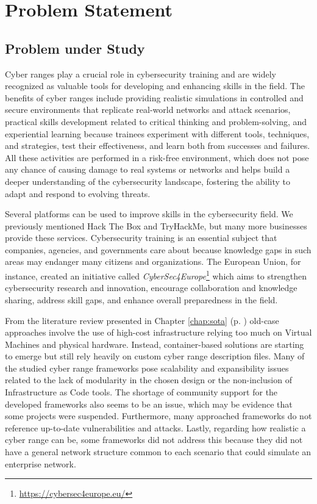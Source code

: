 \chapter{Problem Statement}\label{chap:problem_statement}

\minitoc

\section{Problem under Study} \label{sec:research_problem}

Cyber ranges play a crucial role in cybersecurity training and are widely recognized as valuable tools for developing and enhancing skills in the field. The benefits of cyber ranges include providing realistic simulations in controlled and secure environments that replicate real-world networks and attack scenarios, practical skills development related to critical thinking and problem-solving, and experiential learning because trainees experiment with different tools, techniques, and strategies, test their effectiveness, and learn both from successes and failures. All these activities are performed in a risk-free environment, which does not pose any chance of causing damage to real systems or networks and helps build a deeper understanding of the cybersecurity landscape, fostering the ability to adapt and respond to evolving threats. 

Several platforms can be used to improve skills in the cybersecurity field. We previously mentioned Hack The Box and TryHackMe, but many more businesses provide these services. Cybersecurity training is an essential subject that companies, agencies, and governments care about because knowledge gaps in such areas may endanger many citizens and organizations. The European Union, for instance, created an initiative called \textit{CyberSec4Europe}\footnote{\url{https://cybersec4europe.eu/}} which aims to strengthen cybersecurity research and innovation, encourage collaboration and knowledge sharing, address skill gaps, and enhance overall preparedness in the field. 

From the literature review presented in Chapter \ref{chap:sota} (p. \pageref{chap:sota}) old-case approaches involve the use of high-cost infrastructure relying too much on Virtual Machines and physical hardware. Instead, container-based solutions are starting to emerge but still rely heavily on custom cyber range description files. Many of the studied cyber range frameworks pose scalability and expansibility issues related to the lack of modularity in the chosen design or the non-inclusion of Infrastructure as Code tools. The shortage of community support for the developed frameworks also seems to be an issue, which may be evidence that some projects were suspended. Furthermore, many approached frameworks do not reference up-to-date vulnerabilities and attacks. Lastly, regarding how realistic a cyber range can be, some frameworks did not address this because they did not have a general network structure common to each scenario that could simulate an enterprise network. 


